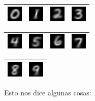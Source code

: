 \newpage
\begin{table}[h!]
\begin{tabular}{|c|c|c|c|}
	\hline
	\includegraphics[scale=4.0]{exp6/digit0} &
	\includegraphics[scale=4.0]{exp6/digit1} &
	\includegraphics[scale=4.0]{exp6/digit2} &
	\includegraphics[scale=4.0]{exp6/digit3} \\
	\hline
\end{tabular}
\begin{tabular}{|c|c|c|c|}
	\hline
	\includegraphics[scale=4.0]{exp6/digit4} &
	\includegraphics[scale=4.0]{exp6/digit5} &
	\includegraphics[scale=4.0]{exp6/digit6} &
	\includegraphics[scale=4.0]{exp6/digit7} \\
	\hline
\end{tabular}
\begin{tabular}{|c|c|}
	\hline
	\includegraphics[scale=4.0]{exp6/digit8} &
	\includegraphics[scale=4.0]{exp6/digit9} \\
	\hline
\end{tabular}
\end{table}

Esto nos dice algunas cosas: \\

